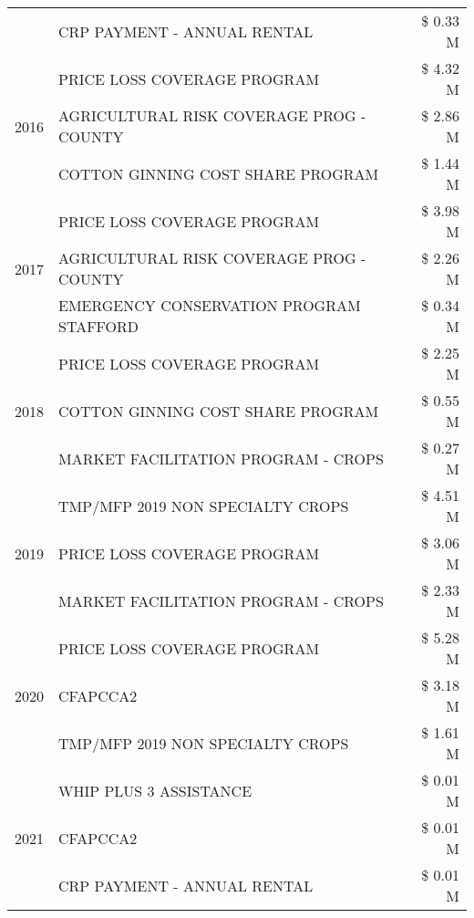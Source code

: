 \begin{tabular}{llr}
 & CRP PAYMENT - ANNUAL RENTAL & \$ 0.33 M \\
\cline{1-3}
\multirow[t]{3}{*}{2016} & PRICE LOSS COVERAGE PROGRAM & \$ 4.32 M \\
 & AGRICULTURAL RISK COVERAGE PROG - COUNTY & \$ 2.86 M \\
 & COTTON GINNING COST SHARE PROGRAM & \$ 1.44 M \\
\cline{1-3}
\multirow[t]{3}{*}{2017} & PRICE LOSS COVERAGE PROGRAM & \$ 3.98 M \\
 & AGRICULTURAL RISK COVERAGE PROG - COUNTY & \$ 2.26 M \\
 & EMERGENCY CONSERVATION PROGRAM STAFFORD & \$ 0.34 M \\
\cline{1-3}
\multirow[t]{3}{*}{2018} & PRICE LOSS COVERAGE PROGRAM & \$ 2.25 M \\
 & COTTON GINNING COST SHARE PROGRAM & \$ 0.55 M \\
 & MARKET FACILITATION PROGRAM - CROPS & \$ 0.27 M \\
\cline{1-3}
\multirow[t]{3}{*}{2019} & TMP/MFP 2019 NON SPECIALTY CROPS & \$ 4.51 M \\
 & PRICE LOSS COVERAGE PROGRAM & \$ 3.06 M \\
 & MARKET FACILITATION PROGRAM - CROPS & \$ 2.33 M \\
\cline{1-3}
\multirow[t]{3}{*}{2020} & PRICE LOSS COVERAGE PROGRAM & \$ 5.28 M \\
 & CFAPCCA2 & \$ 3.18 M \\
 & TMP/MFP 2019 NON SPECIALTY CROPS & \$ 1.61 M \\
\cline{1-3}
\multirow[t]{3}{*}{2021} & WHIP PLUS 3 ASSISTANCE & \$ 0.01 M \\
 & CFAPCCA2 & \$ 0.01 M \\
 & CRP PAYMENT - ANNUAL RENTAL & \$ 0.01 M \\
\cline{1-3}
\bottomrule
\end{tabular}
